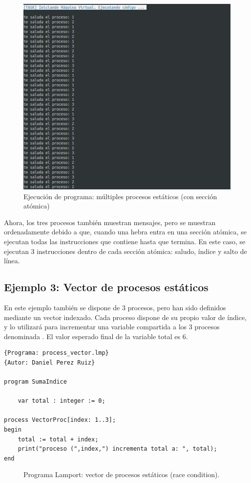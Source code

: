 \newpage
\begin{figure}[h]
    \includegraphics[width=\linewidth]{images/ejemplos/concurrentes/multiple_process_atomic.png}
    \caption{Ejecución de programa: múltiples procesos estáticos (con sección atómica)}
    \label{fig:lamportMultipleProcessAtomic_exec}
\end{figure}

Ahora, los tres procesos también muestran mensajes, pero se muestran ordenadamente debido a que, cuando una hebra entra en una sección atómica, se ejecutan todas las instrucciones que contiene hasta que termina. En este caso, se ejecutan 3 instrucciones dentro de cada sección atómica: saludo, índice y salto de línea.

\newpage
\subsection{Ejemplo 3: Vector de procesos estáticos}
En este ejemplo también se dispone de 3 procesos, pero han sido definidos mediante un vector indexado. Cada proceso dispone de su propio valor de índice, y lo utilizará para incrementar una variable compartida a los 3 procesos denominada . El valor esperado final de la variable total es 6.
\begin{lstlisting}[style=lamportStyle]
{Programa: process_vector.lmp}
{Autor: Daniel Perez Ruiz}

program SumaIndice

	var total : integer := 0;

process VectorProc[index: 1..3];
begin
    total := total + index;
   	print("proceso (",index,") incrementa total a: ", total);
end
\end{lstlisting}
\begin{figure}[h]
\caption{Programa Lamport: vector de procesos estáticos (race condition).}
\label{fig:lamportProcessVector}
\end{figure}

